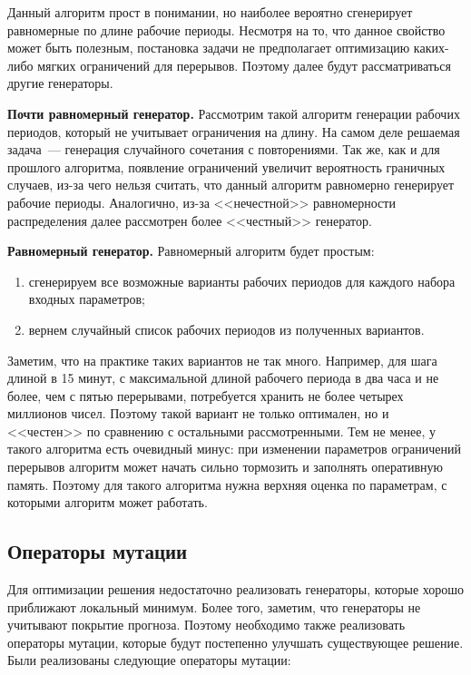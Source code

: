 \documentclass[times,specification,annotation]{itmo-student-thesis}
\begin{document}
Данный алгоритм прост в понимании, но наиболее вероятно сгенерирует равномерные по длине рабочие периоды.
Несмотря на то, что данное свойство может быть полезным, постановка задачи не предполагает оптимизацию каких-либо мягких ограничений для перерывов.
Поэтому далее будут рассматриваться другие генераторы.

\textbf{Почти равномерный генератор.}
Рассмотрим такой алгоритм генерации рабочих периодов, который не учитывает ограничения на длину.
На самом деле решаемая задача~--- генерация случайного сочетания с повторениями.
Так же, как и для прошлого алгоритма, появление ограничений увеличит вероятность граничных случаев, из-за чего нельзя считать, что данный алгоритм равномерно генерирует рабочие периоды.
Аналогично, из-за <<нечестной>> равномерности распределения далее рассмотрен более <<честный>> генератор.

\textbf{Равномерный генератор.}
Равномерный алгоритм будет простым:

\begin{enumerate}
    \item сгенерируем все возможные варианты рабочих периодов для каждого набора входных параметров;
    \item вернем случайный список рабочих периодов из полученных вариантов.
\end{enumerate}

Заметим, что на практике таких вариантов не так много.
Например, для шага длиной в 15 минут, с максимальной длиной рабочего периода в два часа и не более, чем с пятью перерывами, потребуется хранить не более четырех миллионов чисел.
Поэтому такой вариант не только оптимален, но и <<честен>> по сравнению с остальными рассмотренными.
Тем не менее, у такого алгоритма есть очевидный минус: при изменении параметров ограничений перерывов алгоритм может начать сильно тормозить и заполнять оперативную память.
Поэтому для такого алгоритма нужна верхняя оценка по параметрам, с которыми алгоритм может работать.

\subsection{Операторы мутации}

Для оптимизации решения недостаточно реализовать генераторы, которые хорошо приближают локальный минимум.
Более того, заметим, что генераторы не учитывают покрытие прогноза.
Поэтому необходимо также реализовать операторы мутации, которые будут постепенно улучшать существующее решение.
Были реализованы следующие операторы мутации:
\end{document}
